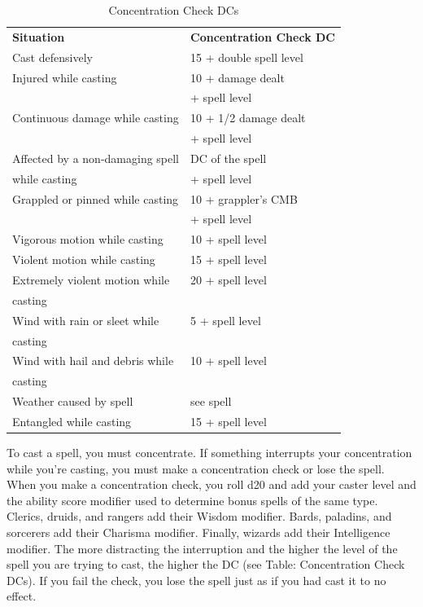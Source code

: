 \begin{table}
 \sffamily
 \caption{Concentration Check DCs}
 \begin{tabular}{ll}
\textbf{Situation} & \textbf{Concentration Check DC}\\
Cast defensively & 15 + double spell level\\
Injured while casting & 10 + damage dealt\\
                      & + spell level\\
Continuous damage while casting & 10 + 1/2 damage dealt \\
                                & + spell level\\
Affected by a non-damaging spell & DC of the spell\\
 while casting                    & + spell level\\
Grappled or pinned while casting & 10 + grappler's CMB \\
                                 & + spell level\\
Vigorous motion while casting & 10 + spell level\\
Violent motion while casting & 15 + spell level\\
Extremely violent motion while & 20 + spell level\\
casting & \\
Wind with rain or sleet while& 5 + spell level\\
 casting & \\
Wind with hail and debris while& 10 + spell level\\
 casting & \\
Weather caused by spell & see spell\\
Entangled while casting & 15 + spell level\\
 \end{tabular}

\end{table}


				
To cast a spell, you must concentrate. If something interrupts your concentration while you're casting, you must make a concentration check or lose the spell. When you make a concentration check, you roll d20 and add your caster level and the ability score modifier used to determine bonus spells of the same type. Clerics, druids, and rangers add their Wisdom modifier. Bards, paladins, and sorcerers add their Charisma modifier. Finally, wizards add their Intelligence modifier. The more distracting the interruption and the higher the level of the spell you are trying to cast, the higher the DC (see Table: Concentration Check DCs). If you fail the check, you lose the spell just as if you had cast it to no effect.
				
